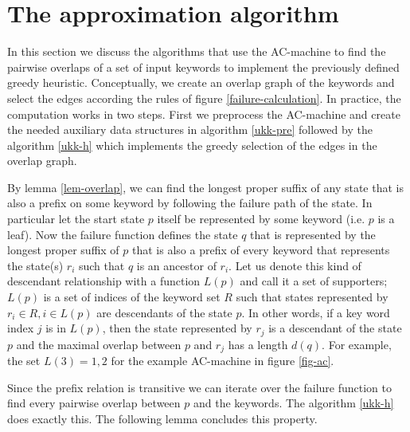 \documentclass[english,twoside,censored,csm,algorithms-track-2020]{HYthesisML}
\theoremstyle{plain}
\theoremstyle{definition}
\begin{document}

\section{The approximation algorithm}

In this section we discuss the algorithms that use the AC-machine to find the pairwise overlaps
of a set of input keywords to implement the previously defined greedy heuristic. Conceptually,
we create an overlap graph of the keywords and select the edges according the rules of
figure \ref{failure-calculation}. In practice, the computation works in two steps. First we
preprocess the AC-machine and create the needed auxiliary data structures in algorithm \ref{ukk-pre}
followed by the algorithm \ref{ukk-h} which implements the greedy selection of the edges in the
overlap graph.

By lemma \ref{lem-overlap}, we can find the longest proper suffix of any state that is also
a prefix on some keyword by following the failure path of the state. In particular let the start
state $p$ itself be represented by some keyword (i.e. $p$ is a leaf). Now the failure function
defines the state $q$ that is represented by the longest proper suffix of $p$ that is also a prefix
of every keyword that represents the state(s) $r_i$ such that $q$ is an ancestor of $r_i$. 
Let us denote this kind of descendant relationship with a function $L(p)$ and call it a set of
supporters; $L(p)$ is a set of indices of the keyword set $R$ such that states represented by
$r_i\in R, i\in L(p)$ are descendants of the state $p$. In other words, if a key word index
$j$ is in $L(p)$, then the state represented by $r_j$ is a descendant of the state $p$ and
the maximal overlap between $p$ and $r_j$ has a length $d(q)$. For example, the set $L(3) = 1,2$
for the example AC-machine in figure \ref{fig-ac}.


Since the prefix relation is transitive we can iterate over the failure function to find every
pairwise overlap between $p$ and the keywords. The algorithm \ref{ukk-h} does exactly this.
The following lemma concludes this property.


\end{document}
